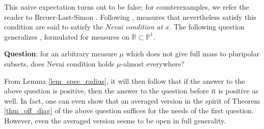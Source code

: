 \documentclass[12pt]{article}
\numberwithin{equation}{section}
\theoremstyle{theorem}
\theoremstyle{definition}
\theoremstyle{remark}
\begin{document}
	This naive expectation turns out to be false; for counterexamples, we refer the reader to Breuer-Last-Simon \cite[\S3-5]{NevaiCond}.
	Following \cite{NevaiCond}, measures that nevertheless satisfy this condition are said to satisfy the \textit{Nevai condition at $x$}.
	The following question generalizes \cite[Conjecture 1.4]{NevaiCond}, formulated for measures on $\mathbb{R} \subset \mathbb{P}^1$.
	\par 
	\textbf{Question}: for an arbitrary measure $\mu$ which does not give full mass to pluripolar subsets, does Nevai condition holds $\mu$-almost everywhere?
	\par 
	From Lemma \ref{lem_spec_radius}, it will then follow that if the answer to the above question is positive, then the answer to the question before it is positive as well.
	In fact, one can even show that an averaged version in the spirit of Theorem \ref{thm_off_diag} of the above question suffices for the needs of the first question.
	However, even the averaged version seems to be open in full generality.
	
\end{document}
